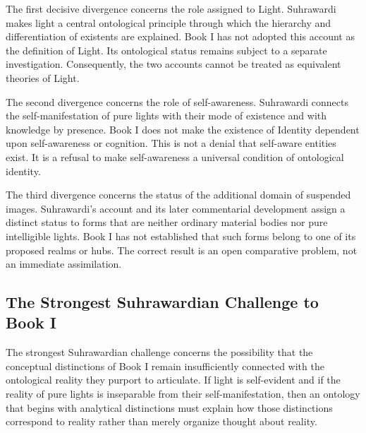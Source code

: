 \label{para:VS.B01.P01.C08.S14.SS16.P003}

The first decisive divergence concerns
the role assigned to Light.
Suhrawardi makes light a central
ontological principle through
which the hierarchy and
differentiation of existents
are explained. Book I has not
adopted this account as the
definition of Light. Its
ontological status remains
subject to a separate
investigation. Consequently,
the two accounts cannot
be treated as equivalent
theories of Light.

\label{para:VS.B01.P01.C08.S14.SS16.P004}

The second divergence concerns
the role of self-awareness.
Suhrawardi connects the
self-manifestation of pure
lights with their mode of
existence and with knowledge
by presence. Book I does
not make the existence of
Identity dependent upon
self-awareness or cognition.
This is not a denial that
self-aware entities exist.
It is a refusal to make
self-awareness a universal
condition of ontological
identity.

\label{para:VS.B01.P01.C08.S14.SS16.P005}

The third divergence concerns
the status of the additional
domain of suspended images.
Suhrawardi's account and
its later commentarial
development assign a
distinct status to forms
that are neither ordinary
material bodies nor pure
intelligible lights. Book I
has not established that
such forms belong to one
of its proposed realms or
hubs. The correct result
is an open comparative
problem, not an immediate
assimilation.


\subsection{The Strongest Suhrawardian Challenge to Book I}
\label{sec:ch08-s14-ss17}

\label{para:VS.B01.P01.C08.S14.SS17.P001}

The strongest Suhrawardian challenge concerns
the possibility that the conceptual
distinctions of Book I remain
insufficiently connected with
the ontological reality they
purport to articulate. If
light is self-evident and
if the reality of pure lights
is inseparable from their
self-manifestation, then an
ontology that begins with
analytical distinctions
must explain how those
distinctions correspond
to reality rather than
merely organize thought
about reality.

